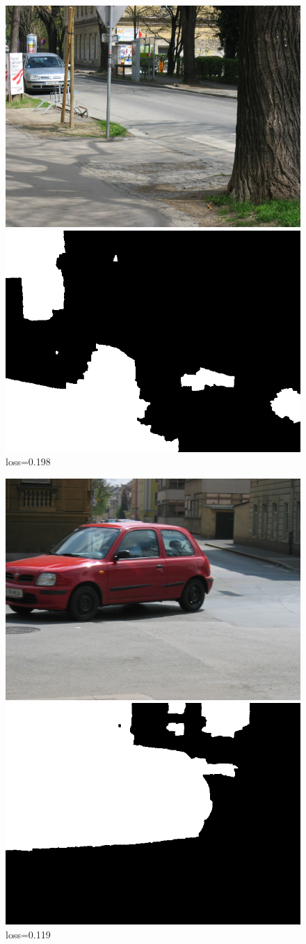 \documentclass[russian,10pt,a4paper]{article}
\theoremstyle{definition}
\begin{document}
\begin{figure}[!h]
  \center
    \includegraphics[width=0.45\linewidth]{images/imgTrain_143}$ $
    \includegraphics[width=0.45\linewidth]{images/143_segm_res}
loss=0.198
\end{figure}

\begin{figure}[!h]
  \center
    \includegraphics[width=0.45\linewidth]{images/imgTrain_144}$ $
    \includegraphics[width=0.45\linewidth]{images/144_segm_res}
loss=0.119
\end{figure}
\end{document}
